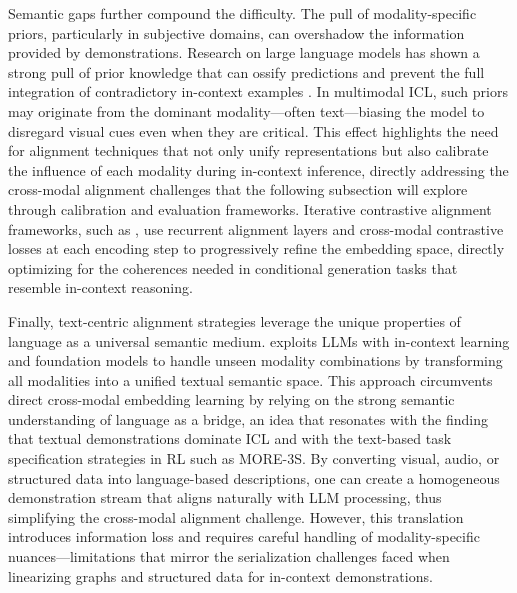 \documentclass[11pt]{article}
\begin{document}
Semantic gaps further compound the difficulty. The pull of modality-specific priors, particularly in subjective domains, can overshadow the information provided by demonstrations. Research on large language models has shown a strong pull of prior knowledge that can ossify predictions and prevent the full integration of contradictory in-context examples \cite{ref42}. In multimodal ICL, such priors may originate from the dominant modality---often text---biasing the model to disregard visual cues even when they are critical. This effect highlights the need for alignment techniques that not only unify representations but also calibrate the influence of each modality during in-context inference, directly addressing the cross-modal alignment challenges that the following subsection will explore through calibration and evaluation frameworks. Iterative contrastive alignment frameworks, such as \cite{ref160}, use recurrent alignment layers and cross-modal contrastive losses at each encoding step to progressively refine the embedding space, directly optimizing for the coherences needed in conditional generation tasks that resemble in-context reasoning.

Finally, text-centric alignment strategies leverage the unique properties of language as a universal semantic medium. \cite{ref161} exploits LLMs with in-context learning and foundation models to handle unseen modality combinations by transforming all modalities into a unified textual semantic space. This approach circumvents direct cross-modal embedding learning by relying on the strong semantic understanding of language as a bridge, an idea that resonates with the finding that textual demonstrations dominate ICL and with the text-based task specification strategies in RL such as MORE-3S. By converting visual, audio, or structured data into language-based descriptions, one can create a homogeneous demonstration stream that aligns naturally with LLM processing, thus simplifying the cross-modal alignment challenge. However, this translation introduces information loss and requires careful handling of modality-specific nuances---limitations that mirror the serialization challenges faced when linearizing graphs and structured data for in-context demonstrations.
\end{document}

